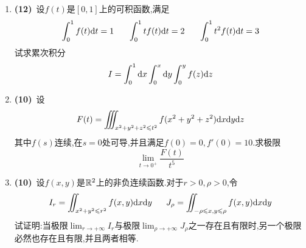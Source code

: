\documentclass{ctexart}
\begin{document}
\begin{enumerate}[leftmargin=*,label=\textbf{\arabic*.}]
    \item \textbf{(12)}\ 设$f(t)$是$[0,1]$上的可积函数,满足
        \[\int_0^1f(t)\di t=1\ \ \ \ \ \int_0^1tf(t)\di t=2\ \ \ \ \ \int_0^1t^2f(t)\di t=3\]
        试求累次积分
        \[I=\int_0^1\mathrm{d} x\int_0^x\mathrm{d} y\int_0^yf(z)\mathrm{d} z\]

    \item \textbf{(10)}\ 设
        \[F(t)=\iiint_{x^2+y^2+z^2\leqslant t^2}f(x^2+y^2+z^2)\mathrm{d} x\mathrm{d} y\mathrm{d} z\]
        其中$f(s)$连续,在$s=0$处可导,并且满足$f(0)=0,f'(0)=10$.求极限
        \[\lim_{t\to0^+}\dfrac{F(t)}{t^5}\]
    
    \item \textbf{(10)}\ 设$f(x,y)$是$\mathbb{R}^2$上的非负连续函数.对于$r>0,\rho>0$,令
        \[I_r=\iint_{x^2+y^2\leqslant r^2}f(x,y)\mathrm{d} x\mathrm{d} y\ \ \ \ \ J_{\rho}=\iint_{-\rho\leqslant x,y\leqslant\rho}f(x,y)\mathrm{d} x\mathrm{d} y\]
        试证明:当极限$\displaystyle\lim_{r\to+\infty}I_r$与极限$\displaystyle\lim_{\rho\to+\infty}J_\rho$之一存在且有限时,另一个极限必然也存在且有限,并且两者相等.
\end{enumerate}
\end{document}
